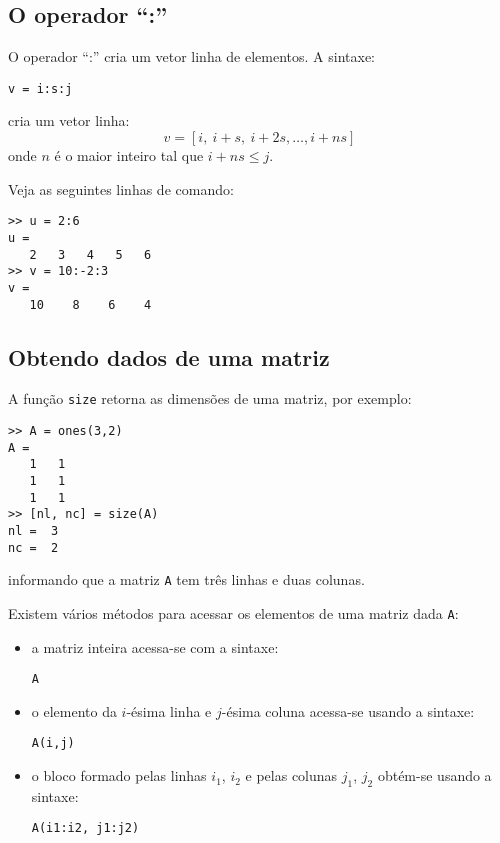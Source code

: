 \subsection{O operador ``:''}

O operador ``:'' cria um vetor linha de elementos. A sintaxe:
\begin{verbatim}
v = i:s:j
\end{verbatim}
cria um vetor linha:
\begin{equation}
  v = [i,~i+s,~i+2s,\dotsc, i+ns]
\end{equation}
onde $n$ é o maior inteiro tal que $i + ns \leq j$.

\begin{ex}
Veja as seguintes linhas de comando:
\begin{verbatim}
>> u = 2:6
u =
   2   3   4   5   6
>> v = 10:-2:3
v =
   10    8    6    4
\end{verbatim}
\end{ex}

\subsection{Obtendo dados de uma matriz}

A função \verb+size+ retorna as dimensões de uma matriz, por exemplo:
\begin{verbatim}
>> A = ones(3,2)
A =
   1   1
   1   1
   1   1 
>> [nl, nc] = size(A)
nl =  3
nc =  2
\end{verbatim}
informando que a matriz \verb+A+ tem três linhas e duas colunas.

Existem vários métodos para acessar os elementos de uma matriz dada \verb+A+:
\begin{itemize}
\item a matriz inteira acessa-se com a sintaxe:
\begin{verbatim}
A
\end{verbatim}
\item o elemento da $i$-ésima linha e $j$-ésima coluna acessa-se usando a sintaxe:
\begin{verbatim}
A(i,j)
\end{verbatim}
\item o bloco formado pelas linhas $i_1$, $i_2$ e pelas colunas $j_1$, $j_2$ obtém-se usando a sintaxe:
\begin{verbatim}
A(i1:i2, j1:j2)
\end{verbatim}
\end{itemize}

